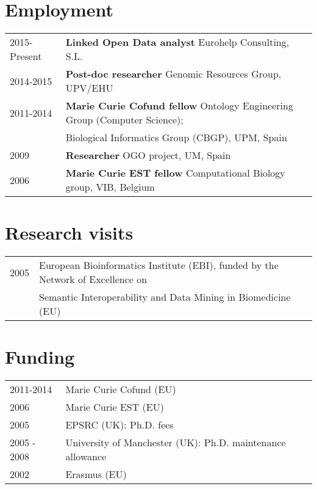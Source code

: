 \documentclass[11pt,fullpage]{article}
\begin{document}
\section*{Employment}


\begin{tabular}{ll}
 2015-Present & {\bf Linked Open Data analyst} Eurohelp Consulting, S.L. \\
 2014-2015 & {\bf Post-doc researcher} Genomic Resources Group, UPV/EHU  \\
 2011-2014 & {\bf Marie Curie Cofund fellow} Ontology Engineering Group (Computer Science); \\ 
	    &Biological Informatics Group (CBGP), UPM, Spain \\
 2009 & {\bf Researcher} OGO project, UM, Spain \\
 2006 & {\bf Marie Curie EST fellow} Computational Biology group, VIB, Belgium \\
\end{tabular}

\section*{Research visits}

\begin{tabular}{ll}
 2005 & European Bioinformatics Institute (EBI), funded by the Network of Excellence on \\ 
      & Semantic Interoperability and Data Mining in Biomedicine (EU)

\end{tabular}   

\section*{Funding}

\begin{tabular}{ll}
	2011-2014 & Marie Curie Cofund (EU) \\  
	2006 & Marie Curie EST (EU) \\
	2005 & EPSRC (UK): Ph.D. fees \\
	2005 - 2008 & University of Manchester (UK): Ph.D. maintenance allowance \\
	2002 & Erasmus (EU) \\
\end{tabular}
\end{document}
